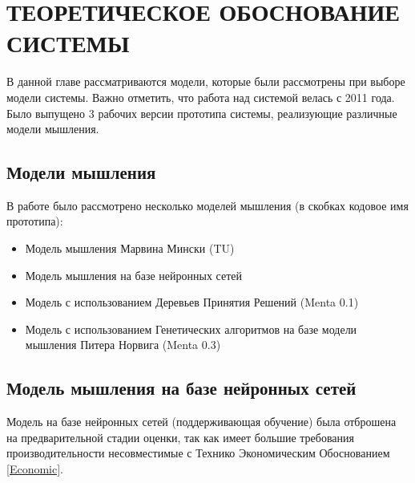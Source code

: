 \chapter{ТЕОРЕТИЧЕСКОЕ ОБОСНОВАНИЕ СИСТЕМЫ}
В данной главе рассматриваются модели, которые были рассмотрены при выборе модели системы. Важно отметить, что работа над системой велась с 2011 года. Было выпущено 3 рабочих версии прототипа системы, реализующие различные модели мышления. 
\section{Модели мышления}
В работе было рассмотрено несколько моделей мышления (в скобках кодовое имя прототипа):
\begin{itemize}
	\item Модель мышления Марвина Мински \cite{EmotionMachine} (TU)
	\item Модель мышления на базе нейронных сетей 
	\item Модель с использованием Деревьев Принятия Решений (Menta 0.1)
	\item Модель с использованием Генетических алгоритмов на базе модели мышления Питера Норвига \cite{ArtificialIntelligence} (Menta 0.3)
\end{itemize}



\section{Модель мышления на базе нейронных сетей}
Модель на базе нейронных сетей (поддерживающая обучение) была отброшена на предварительной стадии оценки, так как имеет большие требования производительности \cite{NEURAL} несовместимые с Технико Экономическим Обоснованием \ref{Economic}.


